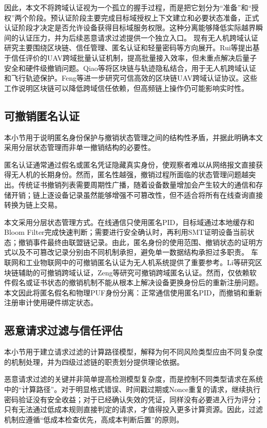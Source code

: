 \documentclass[conference]{IEEEtran}
\begin{document}
	因此，本文不将跨域认证视为一个孤立的握手过程，而是把它划分为“准备”和“授权”两个阶段。预认证阶段主要完成目标域授权上下文建立和必要状态准备，正式认证阶段才决定是否允许设备获得目标域服务权限。这种分离能够降低实际越界瞬间的认证压力，并为后续恶意请求过滤提供一个独立入口。
	现有无人机跨域认证研究主要围绕区块链、信任管理、匿名认证和轻量密码等方向展开。Rui等提出基于信任评价的UAV跨域批量认证机制，提高批量接入效率，但未重点解决后量子安全和硬件级撤销问题\cite{b1}。Qiao等将区块链与轨迹隐私结合，用于无人机跨域认证和飞行轨迹保护\cite{b2}。Feng等进一步研究可信高效的区块链UAV跨域认证协议\cite{b21}。这些工作说明区块链可以降低跨域信任依赖，但高频链上操作仍可能影响实时性。
	
	\subsection{可撤销匿名认证}
	
	本小节用于说明匿名身份保护与撤销状态管理之间的结构性矛盾，并据此明确本文采用分层状态管理而非单一撤销结构的必要性。
	
	匿名认证通常通过假名或匿名凭证隐藏真实身份，使观察者难以从网络报文直接获得无人机的长期身份。然而，匿名性越强，撤销过程所面临的状态管理问题越突出。传统证书撤销列表需要周期性广播，随着设备数量增加会产生较大的通信和存储开销；链上逐设备记录虽然能够增强不可篡改性，但不适合将所有在线查询直接转换为链上交易。
	
	本文采用分层状态管理方式。在线通信只使用匿名PID，目标域通过本地缓存和Bloom Filter完成快速判断；需要进行安全确认时，再利用SMT证明设备当前状态；撤销事件最终由联盟链记录。由此，匿名身份的使用范围、撤销状态的证明方式以及不可篡改记录分别由不同机制承担，避免单一数据结构承担过多职责。
	车联网和工业物联网中的可撤销匿名认证为无人机系统提供了重要参考。Li等研究区块链辅助的可撤销跨域认证\cite{b3}，Zeng等研究可撤销跨域匿名认证\cite{b17}。然而，仅依赖软件假名或证书状态的撤销机制不能从根本上解决设备更换身份后的重新注册问题。本文因此将匿名假名和物理PUF身份分离：正常通信使用匿名PID，而撤销和重新注册审计使用硬件绑定状态。
	
	\subsection{恶意请求过滤与信任评估}
	
	本小节用于建立请求过滤的计算路径模型，解释为何不同风险类型应由不同复杂度的机制处理，并为四级过滤链的职责划分提供理论依据。
	
	恶意请求过滤的关键并非简单提高检测模型复杂度，而是控制不同类型请求在系统中的“计算路径”。对于明显格式错误、时间戳过期或Nonce重复的请求，继续执行密码验证没有安全收益；对于已经确认失效的凭证，同样没有必要进入行为评分；只有无法通过低成本规则直接判定的请求，才值得投入更多计算资源。因此，过滤机制应遵循“低成本检查优先，高成本判断后置”的原则。
	
\end{document}
